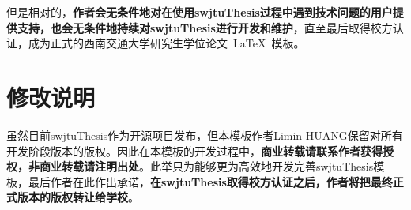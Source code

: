 \par
但是相对的，\textbf{作者会无条件地对在使用swjtuThesis过程中遇到技术问题的用户提供支持，也会无条件地持续对swjtuThesis进行开发和维护}，直至最后取得校方认证，成为正式的西南交通大学研究生学位论文~\LaTeX{}~模板。


\section{修改说明}
虽然目前swjtuThesis作为开源项目发布，但本模板作者Limin HUANG保留对所有开发阶段版本的版权。因此在本模板的开发过程中，\textbf{商业转载请联系作者获得授权，非商业转载请注明出处}。此举只为能够更为高效地开发完善swjtuThesis模板，最后作者在此作出承诺，\textbf{在swjtuThesis取得校方认证之后，作者将把最终正式版本的版权转让给学校}。
